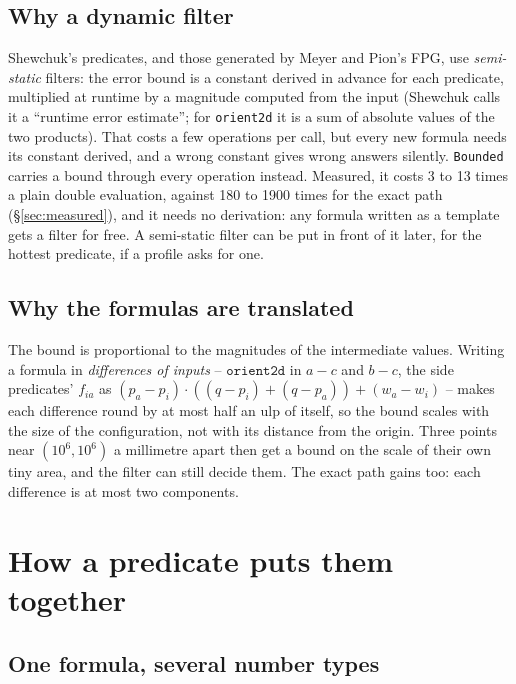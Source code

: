 \documentclass[11pt,a4paper]{article}
\newcommand{\code}[1]{\texttt{#1}}
\newcommand{\secref}[1]{\S\ref{#1}}
\theoremstyle{definition}
\theoremstyle{remark}
\begin{document}
\subsection{Why a dynamic filter}

Shewchuk's predicates, and those generated by Meyer and Pion's FPG, use \emph{semi-static}
filters: the error bound is a constant derived in advance for each predicate, multiplied at
runtime by a magnitude computed from the input (Shewchuk calls it a ``runtime error estimate'';
for \code{orient2d} it is a sum of absolute values of the two products). That costs a few
operations per call, but every new formula needs its constant derived, and a wrong constant gives
wrong answers silently. \code{Bounded} carries a bound through every operation instead. Measured,
it costs 3 to 13 times a plain double evaluation, against 180 to 1900 times for the exact path
(\secref{sec:measured}), and it needs no derivation: any formula written as a template gets a
filter for free. A semi-static filter can be put in front of it later, for the hottest predicate,
if a profile asks for one.

\subsection{Why the formulas are translated}

The bound is proportional to the magnitudes of the intermediate values. Writing a formula in
\emph{differences of inputs} -- $\code{orient2d}$ in $a - c$ and $b - c$, the side predicates'
$f_{ia}$ as $(p_a - p_i)\cdot((q - p_i) + (q - p_a)) + (w_a - w_i)$ -- makes each difference round
by at most half an ulp of itself, so the bound scales with the size of the configuration, not with
its distance from the origin. Three points near $(10^6, 10^6)$ a millimetre apart then get a bound
on the scale of their own tiny area, and the filter can still decide them. The exact path gains
too: each difference is at most two components.

\section{How a predicate puts them together}\label{sec:together}

\subsection{One formula, several number types}
\end{document}
